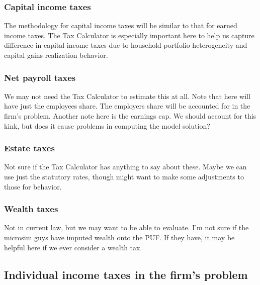 \documentclass[letterpaper,12pt]{article}
\theoremstyle{definition}
\begin{document}
\begin{spacing}{1.5}
\subsubsection{Capital income taxes}
The methodology for capital income taxes will be similar to that for earned income taxes.  The Tax Calculator is especially important here to help us capture difference in capital income taxes due to household portfolio heterogeneity and capital gains realization behavior.

\subsubsection{Net payroll taxes}

We may not need the Tax Calculator to estimate this at all.  Note that here will have just the employees share.  The employers share will be accounted for in the firm's problem.  Another note here is the earnings cap.  We should account for this kink, but does it cause problems in computing the model solution?

\subsubsection{Estate taxes}

Not sure if the Tax Calculator has anything to say about these.  Maybe we can use just the statutory rates, though might want to make some adjustments to those for behavior.

\subsubsection{Wealth taxes}

Not in current law, but we may want to be able to evaluate.  I'm not sure if the microsim guys have imputed wealth onto the PUF.  If they have, it may be helpful here if we ever consider a wealth tax.

\subsection{Individual income taxes in the firm's problem}


\end{spacing}
\end{document}
